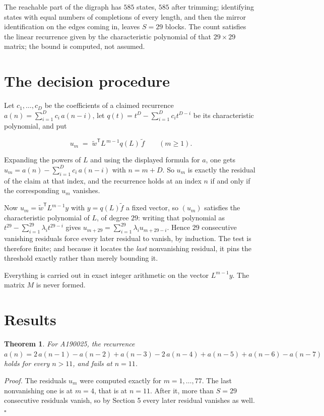 \documentclass[11pt]{article}
\newtheorem{theorem}{Theorem}
\theoremstyle{definition}
\begin{document}
The reachable part of the digraph has $585$ states, $585$ after trimming; identifying states with equal numbers of completions of every length, and then the mirror identification on the edges coming in, leaves $S = 29$ blocks. The count satisfies the linear recurrence given by the characteristic polynomial of that $29\times29$ matrix; the bound is computed, not assumed.

\section{The decision procedure}

Let $c_1,\dots,c_D$ be the coefficients of a claimed recurrence $a(n) = \sum_{i=1}^{D} c_i\,a(n-i)$, let $q(t) = t^{D} - \sum_{i=1}^{D} c_i t^{D-i}$ be its characteristic polynomial, and put

\[u_m \;=\; \tilde w^{\mathsf T} L^{\,m-1} q(L)\,\tilde f \qquad (m \ge 1).\]

Expanding the powers of $L$ and using the displayed formula for $a$, one gets $u_m = a(n) - \sum_{i=1}^{D} c_i\,a(n-i)$ with $n = m + D$. So $u_m$ is exactly the residual of the claim at that index, and the recurrence holds at an index $n$ if and only if the corresponding $u_m$ vanishes.

Now $u_m = \tilde w^{\mathsf T} L^{m-1} y$ with $y = q(L)\tilde f$ a fixed vector, so $(u_m)$ satisfies the characteristic polynomial of $L$, of degree $29$: writing that polynomial as $t^{29} - \sum_{i=1}^{29} \lambda_i t^{29-i}$ gives $u_{m+29} = \sum_{i=1}^{29} \lambda_i u_{m+29-i}$. Hence $29$ consecutive vanishing residuals force every later residual to vanish, by induction. The test is therefore finite; and because it locates the {\itshape last} nonvanishing residual, it pins the threshold exactly rather than merely bounding it.

Everything is carried out in exact integer arithmetic on the vector $L^{m-1}y$. The matrix $M$ is never formed.

\section{Results}

\begin{theorem} For A190025, the recurrence $a(n) = 2\,a(n-1) - a(n-2) + a(n-3) - 2\,a(n-4) + a(n-5) + a(n-6) - a(n-7)$ holds for every $n > 11$, and fails at $n = 11$.\end{theorem}

{\itshape Proof.} The residuals $u_m$ were computed exactly for $m = 1,\dots,77$. The last nonvanishing one is at $m = 4$, that is at $n = 11$. After it, more than $S = 29$ consecutive residuals vanish, so by Section 5 every later residual vanishes as well. $\square$
\end{document}
